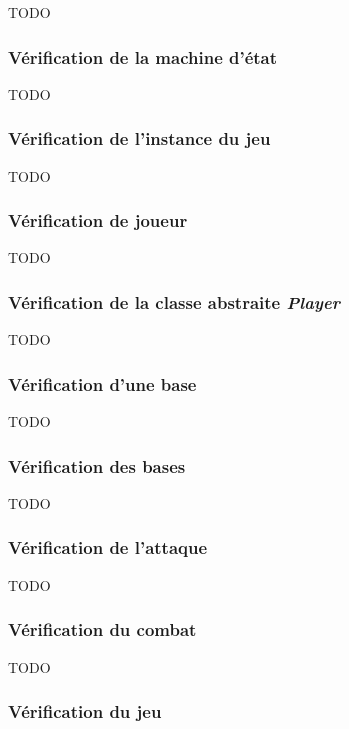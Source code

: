 TODO

\subsubsection{Vérification de la machine d'état}

TODO

\subsubsection{Vérification de l'instance du jeu}

TODO

\subsubsection{Vérification de joueur}

TODO

\subsubsection{Vérification de la classe abstraite \emph{Player}}

TODO

\subsubsection{Vérification d'une base}

TODO

\subsubsection{Vérification des bases}

TODO

\subsubsection{Vérification de l'attaque}

TODO

\subsubsection{Vérification du combat}

TODO

\subsubsection{Vérification du jeu}

